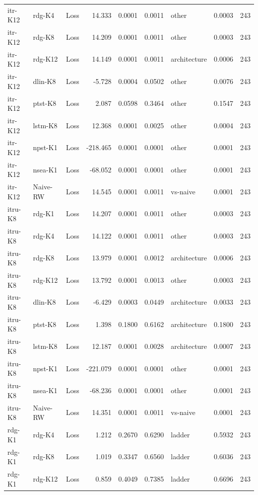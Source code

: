 \begin{table}[!t]
\begin{tabular}{llcrrrlrr}
itr-K12 & rdg-K4 & Loss & 14.333 & 0.0001 & 0.0011 & other & 0.0003 & 243 \\
itr-K12 & rdg-K8 & Loss & 14.209 & 0.0001 & 0.0011 & other & 0.0003 & 243 \\
itr-K12 & rdg-K12 & Loss & 14.149 & 0.0001 & 0.0011 & architecture & 0.0006 & 243 \\
itr-K12 & dlin-K8 & Loss & -5.728 & 0.0004 & 0.0502 & other & 0.0076 & 243 \\
itr-K12 & ptst-K8 & Loss & 2.087 & 0.0598 & 0.3464 & other & 0.1547 & 243 \\
itr-K12 & lstm-K8 & Loss & 12.368 & 0.0001 & 0.0025 & other & 0.0004 & 243 \\
itr-K12 & npst-K1 & Loss & -218.465 & 0.0001 & 0.0001 & other & 0.0001 & 243 \\
itr-K12 & nsea-K1 & Loss & -68.052 & 0.0001 & 0.0001 & other & 0.0001 & 243 \\
itr-K12 & Naive-RW & Loss & 14.545 & 0.0001 & 0.0011 & vs-naive & 0.0001 & 243 \\
itru-K8 & rdg-K1 & Loss & 14.207 & 0.0001 & 0.0011 & other & 0.0003 & 243 \\
itru-K8 & rdg-K4 & Loss & 14.122 & 0.0001 & 0.0011 & other & 0.0003 & 243 \\
itru-K8 & rdg-K8 & Loss & 13.979 & 0.0001 & 0.0012 & architecture & 0.0006 & 243 \\
itru-K8 & rdg-K12 & Loss & 13.792 & 0.0001 & 0.0013 & other & 0.0003 & 243 \\
itru-K8 & dlin-K8 & Loss & -6.429 & 0.0003 & 0.0449 & architecture & 0.0033 & 243 \\
itru-K8 & ptst-K8 & Loss & 1.398 & 0.1800 & 0.6162 & architecture & 0.1800 & 243 \\
itru-K8 & lstm-K8 & Loss & 12.187 & 0.0001 & 0.0028 & architecture & 0.0007 & 243 \\
itru-K8 & npst-K1 & Loss & -221.079 & 0.0001 & 0.0001 & other & 0.0001 & 243 \\
itru-K8 & nsea-K1 & Loss & -68.236 & 0.0001 & 0.0001 & other & 0.0001 & 243 \\
itru-K8 & Naive-RW & Loss & 14.351 & 0.0001 & 0.0011 & vs-naive & 0.0001 & 243 \\
rdg-K1 & rdg-K4 & Loss & 1.212 & 0.2670 & 0.6290 & ladder & 0.5932 & 243 \\
rdg-K1 & rdg-K8 & Loss & 1.019 & 0.3347 & 0.6560 & ladder & 0.6036 & 243 \\
rdg-K1 & rdg-K12 & Loss & 0.859 & 0.4049 & 0.7385 & ladder & 0.6696 & 243 \\

\end{tabular}
\end{table}

